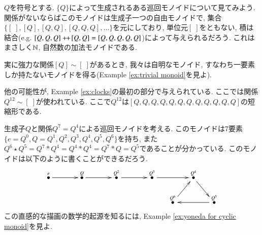 \begin{example}\label{ex:cyclic}


$Q$を符号とする. $\{Q\}$によって生成されるある巡回モノイドについて見てみよう. 関係がないならばこのモノイドは生成子一つの自由モノイドで, 集合$\{[\;],[Q],[Q,Q],[Q,Q,Q],\ldots\}$を元にしており, 単位元$[\;]$をともない, 積は結合(e.g. $[Q,Q,Q]+\!\!+\hspace{1pt}[Q,Q]=[Q,Q,Q,Q,Q]$)によって与えられるだろう. これはまさしく${\mathbb N}$, 自然数の加法モノイドである. 


実に強力な関係$[Q]\sim[\;]$があるとき, 我々は自明なモノイド, すなわち一要素しか持たないモノイドを得る(Example \ref{ex:trivial monoid}を見よ).


他の可能性が, Example \ref{ex:clocks}の最初の部分で与えられている. ここでは関係$Q^{12}\sim[\;]$が使われている. ここで$Q^{12}$は$[Q,Q,Q,Q,Q,Q,Q,Q,Q,Q,Q,Q]$の短縮形である.

\end{example}

\begin{example}\label{ex:cyclic monoid (7,4)}


生成子$Q$と関係$Q^7=Q^4$による巡回モノイドを考える. このモノイドは7要素$\{e=Q^0,Q=Q^1, Q^2, Q^3, Q^4, Q^5, Q^6\}$を持ち, また$Q^6\star Q^5=Q^7*Q^4=Q^4*Q^4=Q^7*Q=Q^5$であることが分かっている. このモノイドは以下のように書くことができるだろう.
$$\xymatrix@=15pt{
\LMO{e}\ar[rr]&&\LMO{Q}\ar[rr]&&\LMO{Q^2}\ar[rr]&&\LMO{Q^3}\ar[rr]&&\LMO{Q^4}\ar[dr]\\
&&&&&&&\LMO{Q^6}\ar[ur]&&\LMO{Q^5}\ar[ll]
}
$$
この直感的な描画の数学的起源を知るには, Example \ref{ex:yoneda for cyclic monoid}を見よ.

\end{example}

